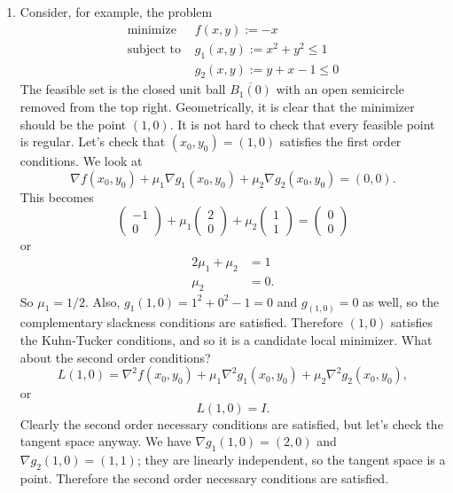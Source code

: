 \documentclass[11pt]{book}
\begin{document}
\begin{enumerate}
\item
Consider, for example, the problem
\begin{align*}
\text{minimize } &f(x,y) := -x \\
\text{subject to } &g_1(x,y) := x^2+y^2 \leq 1 \\
&g_2(x,y) := y+x-1 \leq 0
\end{align*}
The feasible set is the closed unit ball $\overline{B_1(0)}$ with an open semicircle removed from the top right. Geometrically, it is clear that the minimizer should be the point $(1,0)$. It is not hard to check that every feasible point is regular. Let's check that $(x_0, y_0) = (1,0)$ satisfies the first order conditions. We look at
\[
\nabla f (x_0, y_0) + \mu_1 \nabla g_1 (x_0, y_0) + \mu_2 \nabla g_2 (x_0, y_0) = (0,0).
\]
This becomes
\[
\begin{pmatrix}
-1 \\ 0
\end{pmatrix} + \mu_1 \begin{pmatrix}
2 \\ 0
\end{pmatrix} + \mu_2 \begin{pmatrix}
1 \\ 1
\end{pmatrix} = \begin{pmatrix}
0 \\ 0
\end{pmatrix}
\]
or
\begin{align*}
2\mu_1 + \mu_2 &= 1 \\
\mu_2 &= 0.
\end{align*}
So $\mu_1 = 1/2$. Also, $g_1(1,0) = 1^2 + 0^2 - 1 = 0$ and $g_(1,0) = 0$ as well, so the complementary slackness conditions are satisfied. Therefore $(1,0)$ satisfies the Kuhn-Tucker conditions, and so it is a candidate local minimizer. What about the second order conditions?
\[
L(1,0) = \nabla^2 f (x_0, y_0) + \mu_1 \nabla^2 g_1 (x_0, y_0) + \mu_2 \nabla^2 g_2 (x_0, y_0),
\]
or
\[
L(1,0) = I.
\]
Clearly the second order necessary conditions are satisfied, but let's check the tangent space anyway. We have $\nabla g_1(1,0) = (2, 0)$ and $\nabla g_2(1,0) = (1,1)$; they are linearly independent, so the tangent space is a point. Therefore the second order necessary conditions are satisfied.


\end{enumerate}
\end{document}
